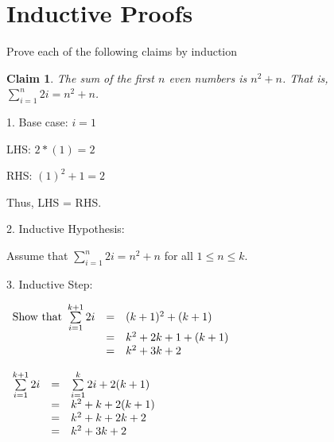 \documentclass{article}
\newtheorem{claim}{Claim}
\begin{document}
    \section{Inductive Proofs}

    Prove each of the following claims by induction

    \begin{claim}
      The sum of the first $n$ even numbers is $n^2 + n$.  That is, $\sum\limits_{i=1}^{n} 2i = n^2 + n$.
    \end{claim}

      
      \vspace{1mm}
      1. Base case: $i = 1$

      LHS: $2 * (1) = 2$

      RHS: $(1)^2 + 1 = 2$

      Thus, LHS = RHS.

      \vspace{5mm}
      2. Inductive Hypothesis: 

      Assume that $\sum\limits_{i=1}^{n} 2i = n^2 + n$ for all $1 \leqslant n \leqslant k$.

      \vspace{5mm}
      3. Inductive Step: 

      \begin{math}
        \begin{array}{r c l}
          \textnormal{Show that } \sum\limits_{i=1}^{k+1} 2i & = & (k+1)^2+(k+1) \\
                                                             & = & k^2+2k+1+(k+1) \\
                                                             & = & k^2+3k+2 \\
        \end{array}
      \end{math}

      \begin{math}
        \begin{array}{r c l}
          \sum\limits_{i=1}^{k+1} 2i & = & \sum\limits_{i=1}^{k} 2i + 2(k+1)\\
                                     & = & k^2 + k + 2(k+1)\\
                                     & = & k^2 + k + 2k + 2\\
                                     & = & k^2 + 3k + 2\\
        \end{array}
      \end{math}
\end{document}
